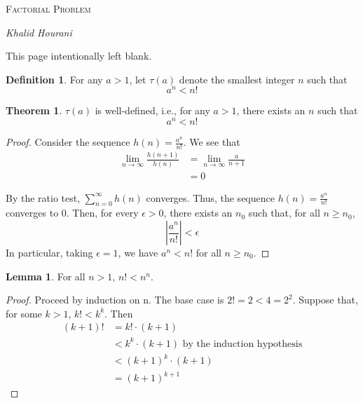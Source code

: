 \documentclass[a4paper]{article}
\theoremstyle{definition}
\newtheorem{definition}{Definition}
\newtheorem{theorem}{Theorem}
\newtheorem{lemma}{Lemma}
\begin{document}
\begin{titlepage}
	\centering
	{\scshape\LARGE Factorial Problem\par}
	\vspace{1cm}
	{\Large\itshape Khalid Hourani\par}
	\vspace{0.5cm}
	\vfill

\end{titlepage}
\vspace*{\fill}\begin{center}{\Huge This page intentionally left blank.}\end{center}\vspace*{\fill}\thispagestyle{empty}\clearpage
{}

\begin{definition}
For any $a > 1$, let $\tau(a)$ denote the smallest integer $n$ such that \[a^n<n!\] 
\end{definition}

\begin{theorem}
$\tau(a)$ is well-defined, i.e., for any $a>1$, there exists an $n$ such that \[a^n<n!\]
\end{theorem}

\begin{proof}
Consider the sequence $h(n)=\frac{a^n}{n!}$. We see that 
\begin{align*}
\lim_{n\to\infty}\frac{h(n+1)}{h(n)}&=\lim_{n\to\infty}\frac{a}{n+1}\\&=0
\end{align*}

By the ratio test, $\displaystyle\sum_{n=0}^{\infty}h(n)$ converges. Thus, the sequence $h(n)=\frac{a^n}{n!}$ converges to 0. Then, for every $\epsilon>0$, there exists an $n_0$ such that, for all $n\geq n_0$, \[\left|\frac{a^n}{n!}\right|<\epsilon\] In particular, taking $\epsilon=1$, we have $a^n<n!$ for all $n\geq n_0$. 
\end{proof}

\begin{lemma}
For all $n>1$, $n!<n^n$.
\end{lemma}

\begin{proof}
Proceed by induction on n. The base case is $2!=2<4=2^2$. Suppose that, for some $k>1$, $k!<k^k$. Then 
\begin{align*}
    (k+1)! &= k!\cdot(k+1)\\
           &< k^k\cdot(k + 1)\text{ by the induction hypothesis}\\
           &< (k+1)^k\cdot(k+1)\\
           &=(k+1)^{k+1}
\end{align*}
\end{proof}
\end{document}
